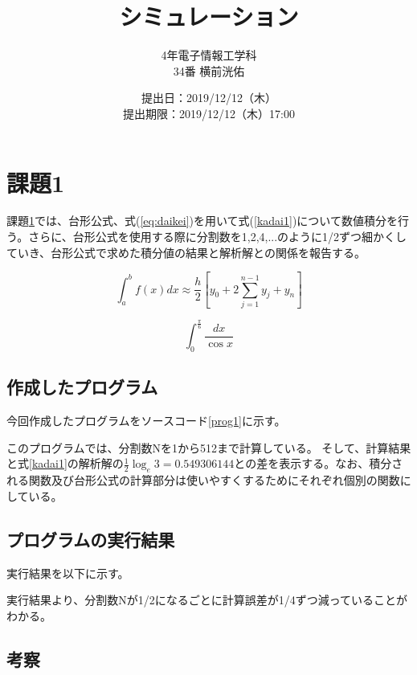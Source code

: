 \documentclass[10pt,titlepage]{jsarticle}
\title{シミュレーション}
\author{4年電子情報工学科\\34番 横前洸佑}
\date{提出日：2019/12/12（木）\\	提出期限：2019/12/12（木）17:00}
\begin{document}
\maketitle

\section{課題1}
\label{sec:kadai1}
課題\ref{sec:kadai1}では、台形公式、式(\ref{eq:daikei})を用いて式(\ref{kadai1})について数値積分を行う。さらに、台形公式を使用する際に分割数を1,2,4,...のように1/2ずつ細かくしていき、台形公式で求めた積分値の結果と解析解との関係を報告する。


\begin{equation}
\label{eq:daikei}
	\int_a^b f(x) dx \approx \frac{h}{2}\left[y_0+2 \sum_{j=1}^{n-1}y_j+y_n\right]
\end{equation}


\begin{equation}
\label{kadai1}
	\int_0^\frac{\pi}{6} \frac{dx}{\cos x}
\end{equation}

\subsection{作成したプログラム}
今回作成したプログラムをソースコード\ref{prog1}に示す。



このプログラムでは、分割数Nを1から512まで計算している。
そして、計算結果と式\ref{kadai1}の解析解の$\frac{1}{2}\log_e3=0.549306144$との差を表示する。なお、積分される関数及び台形公式の計算部分は使いやすくするためにそれぞれ個別の関数にしている。

\subsection{プログラムの実行結果}
実行結果を以下に示す。
\begin{oframed}
\end{oframed}

実行結果より、分割数Nが1/2になるごとに計算誤差が1/4ずつ減っていることがわかる。

\subsection{考察}
\end{document}
